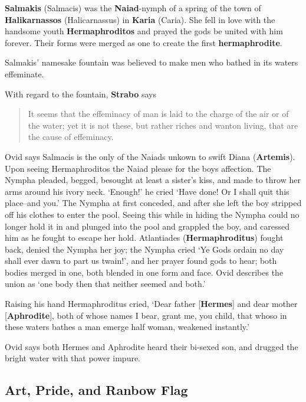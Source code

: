 \textbf{Salmakis} (Salmacis) was the \textbf{Naiad}-nymph of a spring of the town of \textbf{Halikarnassos} (Halicarnassus) in \textbf{Karia} (Caria). She fell in love with the handsome youth \textbf{Hermaphroditos} and prayed the gods be united with him forever. Their forms were merged as one to create the first \textbf{hermaphrodite}. 

\begin{rmk}
    Salmakis' namesake fountain was believed to make men who bathed in its waters effeminate.
\end{rmk}

With regard to the fountain, \textbf{Strabo} says 
\begin{quotation}
    It seems that the effeminacy of man is laid to the charge of the air or of the water; yet it is not these, but rather riches and wanton living, that are the cause of effeminacy.
\end{quotation}

Ovid says Salmacis is the only of the Naiads unkown to swift Diana (\textbf{Artemis}). Upon seeing Hermaphroditos the Naiad please for the boys affection. The Nympha pleaded, begged, besought at least a sister's kiss, and made to throw her arms around his ivory neck. `Enough!' he cried `Have done! Or I shall quit this place--and you.' The Nympha at first conceded, and after she left the boy stripped off his clothes to enter the pool. Seeing this while in hiding the Nympha could no longer hold it in and plunged into the pool and grappled the boy, and caressed him as he fought to escape her hold. Atlantiades (\textbf{Hermaphroditus}) fought back, denied the Nympha her joy; the Nympha cried `Ye Gods ordain no day shall ever dawn to part us twain!', and her prayer found gods to hear; both bodies merged in one, both blended in one form and face. Ovid describes the union as `one body then that neither seemed and both.'

Raising his hand Hermaphroditus cried, `Dear father [\textbf{Hermes}] and dear mother [\textbf{Aphrodite}], both of whose names I bear, grant me, you child, that whoso in these waters bathes a man emerge half woman, weakened instantly.'

Ovid says both Hermes and Aphrodite heard their bi-sexed son, and drugged the bright water with that power impure.



\subsection{Art, Pride, and Ranbow Flag}

